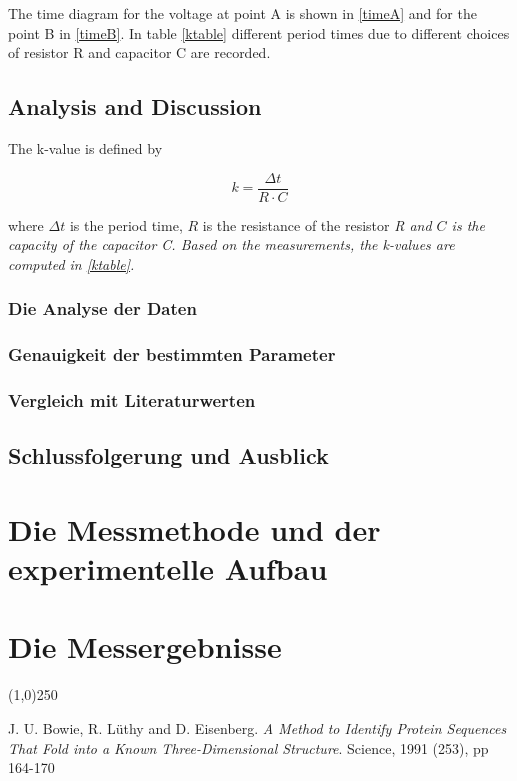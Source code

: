 \documentclass[journal]{IEEEtran}
\begin{document}
The time diagram for the voltage at point A is shown in \ref{timeA} and for the
point B in \ref{timeB}. In table \ref{ktable} different period times due to
different choices of resistor R and capacitor C are recorded.  

\subsection{Analysis and Discussion}

The k-value is defined by

\begin{equation}
	k = \frac{\Delta t}{R \cdot C}
\end{equation}

where $\Delta t$ is the period time, $R$ is the resistance of the resistor
\em{R} and $C$ is the capacity of the capacitor \em{C}. Based on the
measurements, the k-values are computed in \ref{ktable}.

\subsubsection{Die Analyse der Daten}

\subsubsection{Genauigkeit der bestimmten Parameter}

\subsubsection{Vergleich mit Literaturwerten}

\subsection{Schlussfolgerung und Ausblick }

\section{Die Messmethode und der experimentelle Aufbau}

\section{Die Messergebnisse}

\begin{center}
\line(1,0){250}
\end{center}

\begin{thebibliography}{------}
	J. U. Bowie, R. L\"uthy and D. Eisenberg.
	{\em A Method to Identify Protein Sequences That Fold 
	into a Known Three-Dimensional Structure}.
	Science, 1991 (253), pp 164-170
\end{thebibliography}
\end{document}
